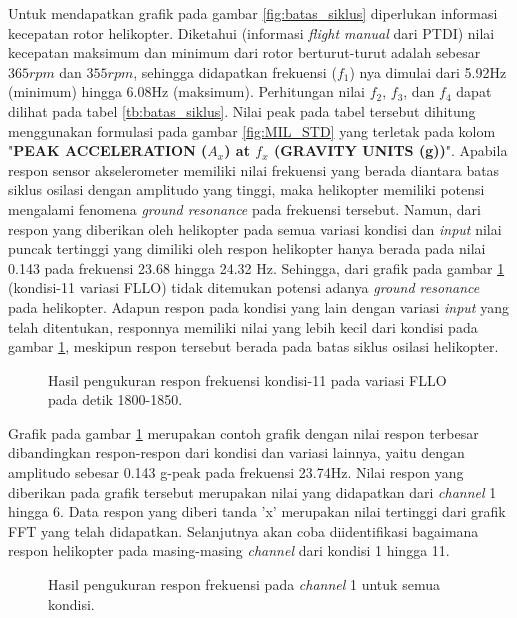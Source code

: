 Untuk mendapatkan grafik pada gambar \ref{fig:batas_siklus} diperlukan informasi kecepatan rotor helikopter. Diketahui (informasi \textit{flight manual} dari PTDI) nilai kecepatan maksimum dan minimum dari rotor berturut-turut adalah sebesar $365 rpm$ dan $355 rpm$, sehingga didapatkan frekuensi ($f_1$) nya dimulai dari 5.92Hz (minimum) hingga 6.08Hz (maksimum). Perhitungan nilai $f_2$, $f_3$, dan $f_4$ dapat dilihat pada tabel \ref{tb:batas_siklus}. Nilai peak pada tabel tersebut dihitung menggunakan formulasi pada gambar \ref{fig:MIL_STD} yang terletak pada kolom "\textbf{PEAK ACCELERATION ($A_x$) at $f_x$ (GRAVITY UNITS (g))}". Apabila respon sensor akselerometer memiliki nilai frekuensi yang berada diantara batas siklus osilasi dengan amplitudo yang tinggi, maka helikopter memiliki potensi mengalami fenomena \textit{ground resonance} pada frekuensi tersebut. Namun, dari respon yang diberikan oleh helikopter pada semua variasi kondisi dan \textit{input} nilai puncak tertinggi yang dimiliki oleh respon helikopter hanya berada pada nilai 0.143 pada frekuensi 23.68 hingga 24.32 Hz. Sehingga, dari grafik pada gambar \ref{fig:11_FLLO} (kondisi-11 variasi FLLO) tidak ditemukan potensi adanya \textit{ground resonance} pada helikopter. Adapun respon pada kondisi yang lain dengan variasi \textit{input} yang telah ditentukan, responnya memiliki nilai yang lebih kecil dari kondisi pada gambar \ref{fig:11_FLLO}, meskipun respon tersebut berada pada batas siklus osilasi helikopter.

\begin{figure}[h]
	\centering
	\caption{Hasil pengukuran respon frekuensi kondisi-11 pada variasi FLLO pada detik 1800-1850.}
	\label{fig:11_FLLO}
\end{figure}

Grafik pada gambar \ref{fig:11_FLLO} merupakan contoh grafik dengan nilai respon terbesar dibandingkan respon-respon dari kondisi dan variasi lainnya, yaitu dengan amplitudo sebesar 0.143 g-peak pada frekuensi 23.74Hz. Nilai respon yang diberikan pada grafik tersebut merupakan nilai yang didapatkan dari \textit{channel} 1 hingga 6. Data respon yang diberi tanda 'x' merupakan nilai tertinggi dari grafik FFT yang telah didapatkan. Selanjutnya akan coba diidentifikasi bagaimana respon helikopter pada masing-masing \textit{channel} dari kondisi 1 hingga 11.

\begin{figure}[h]
	\centering
	\caption{Hasil pengukuran respon frekuensi pada \textit{channel} 1 untuk semua kondisi.}
	\label{fig:channel_1}
\end{figure}

